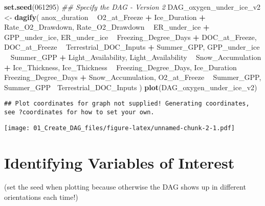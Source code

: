 \documentclass[]{article}
\newenvironment{Shaded}{\begin{snugshade}}{\end{snugshade}}
\newcommand{\CommentTok}[1]{\textcolor[rgb]{0.56,0.35,0.01}{\textit{#1}}}
\newcommand{\DecValTok}[1]{\textcolor[rgb]{0.00,0.00,0.81}{#1}}
\newcommand{\KeywordTok}[1]{\textcolor[rgb]{0.13,0.29,0.53}{\textbf{#1}}}
\newcommand{\NormalTok}[1]{#1}
\newcommand{\OperatorTok}[1]{\textcolor[rgb]{0.81,0.36,0.00}{\textbf{#1}}}
\newcommand{\StringTok}[1]{\textcolor[rgb]{0.31,0.60,0.02}{#1}}
\begin{document}
\begin{Shaded}
\begin{Highlighting}[]
\KeywordTok{set.seed}\NormalTok{(}\DecValTok{061295}\NormalTok{)}
\CommentTok{## Specify the DAG - Version 2}
\NormalTok{DAG_oxygen_under_ice_v2 <-}\StringTok{ }\KeywordTok{dagify}\NormalTok{(}
\NormalTok{  anox_duration }\OperatorTok{~}\StringTok{ }\NormalTok{O2_at_Freeze }\OperatorTok{+}\StringTok{ }\NormalTok{Ice_Duration }\OperatorTok{+}\StringTok{ }\NormalTok{Rate_O2_Drawdown,}
\NormalTok{  Rate_O2_Drawdown }\OperatorTok{~}\StringTok{ }\NormalTok{ER_under_ice }\OperatorTok{+}\StringTok{ }\NormalTok{GPP_under_ice, }
\NormalTok{  ER_under_ice }\OperatorTok{~}\StringTok{ }\NormalTok{Freezing_Degree_Days }\OperatorTok{+}\StringTok{ }\NormalTok{DOC_at_Freeze,}
\NormalTok{  DOC_at_Freeze }\OperatorTok{~}\StringTok{ }\NormalTok{Terrestrial_DOC_Inputs }\OperatorTok{+}\StringTok{ }\NormalTok{Summer_GPP, }
\NormalTok{  GPP_under_ice }\OperatorTok{~}\StringTok{ }\NormalTok{Summer_GPP }\OperatorTok{+}\StringTok{ }\NormalTok{Light_Availability,}
\NormalTok{  Light_Availability }\OperatorTok{~}\StringTok{ }\NormalTok{Snow_Accumulation }\OperatorTok{+}\StringTok{ }\NormalTok{Ice_Thickness,}
\NormalTok{  Ice_Thickness }\OperatorTok{~}\StringTok{ }\NormalTok{Freezing_Degree_Days,}
\NormalTok{  Ice_Duration }\OperatorTok{~}\StringTok{ }\NormalTok{Freezing_Degree_Days }\OperatorTok{+}\StringTok{ }\NormalTok{Snow_Accumulation, }
\NormalTok{  O2_at_Freeze }\OperatorTok{~}\StringTok{ }\NormalTok{Summer_GPP,}
\NormalTok{  Summer_GPP}\OperatorTok{~}\StringTok{ }\NormalTok{Terrestrial_DOC_Inputs}
\NormalTok{)}
\KeywordTok{plot}\NormalTok{(DAG_oxygen_under_ice_v2)}
\end{Highlighting}
\end{Shaded}

\begin{verbatim}
## Plot coordinates for graph not supplied! Generating coordinates, see ?coordinates for how to set your own.
\end{verbatim}

\texttt{[image: 01\_Create\_DAG\_files/figure-latex/unnamed-chunk-2-1.pdf]}

\hypertarget{identifying-variables-of-interest}{%
\section{Identifying Variables of
Interest}\label{identifying-variables-of-interest}}

(set the seed when plotting because otherwise the DAG shows up in
different orientations each time!)
\end{document}
